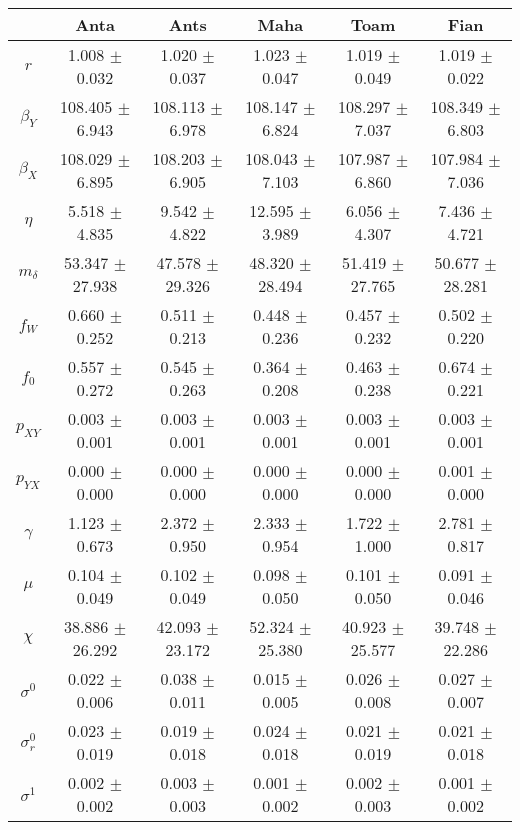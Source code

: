 \begin{sidewaystable}
\centering
\begin{tabular}{cccccc}
 & {\bf Anta} & {\bf Ants} & {\bf Maha} & {\bf Toam} & {\bf Fian} \\
\hline\hline
{\bf $r$} & 1.008 $\pm$ 0.032 & 1.020 $\pm$ 0.037 & 1.023 $\pm$ 0.047 & 1.019 $\pm$ 0.049 & 1.019 $\pm$ 0.022 \\
{\bf $\beta_Y$} & 108.405 $\pm$ 6.943 & 108.113 $\pm$ 6.978 & 108.147 $\pm$ 6.824 & 108.297 $\pm$ 7.037 & 108.349 $\pm$ 6.803 \\
{\bf $\beta_X$} & 108.029 $\pm$ 6.895 & 108.203 $\pm$ 6.905 & 108.043 $\pm$ 7.103 & 107.987 $\pm$ 6.860 & 107.984 $\pm$ 7.036 \\
{\bf $\eta$} & 5.518 $\pm$ 4.835 & 9.542 $\pm$ 4.822 & 12.595 $\pm$ 3.989 & 6.056 $\pm$ 4.307 & 7.436 $\pm$ 4.721 \\
{\bf $m_{\delta}$} & 53.347 $\pm$ 27.938 & 47.578 $\pm$ 29.326 & 48.320 $\pm$ 28.494 & 51.419 $\pm$ 27.765 & 50.677 $\pm$ 28.281 \\
{\bf $f_W$} & 0.660 $\pm$ 0.252 & 0.511 $\pm$ 0.213 & 0.448 $\pm$ 0.236 & 0.457 $\pm$ 0.232 & 0.502 $\pm$ 0.220 \\
{\bf $f_0$} & 0.557 $\pm$ 0.272 & 0.545 $\pm$ 0.263 & 0.364 $\pm$ 0.208 & 0.463 $\pm$ 0.238 & 0.674 $\pm$ 0.221 \\
{\bf $p_{XY}$} & 0.003 $\pm$ 0.001 & 0.003 $\pm$ 0.001 & 0.003 $\pm$ 0.001 & 0.003 $\pm$ 0.001 & 0.003 $\pm$ 0.001 \\
{\bf $p_{YX}$} & 0.000 $\pm$ 0.000 & 0.000 $\pm$ 0.000 & 0.000 $\pm$ 0.000 & 0.000 $\pm$ 0.000 & 0.001 $\pm$ 0.000 \\
{\bf $\gamma$} & 1.123 $\pm$ 0.673 & 2.372 $\pm$ 0.950 & 2.333 $\pm$ 0.954 & 1.722 $\pm$ 1.000 & 2.781 $\pm$ 0.817 \\
{\bf $\mu$} & 0.104 $\pm$ 0.049 & 0.102 $\pm$ 0.049 & 0.098 $\pm$ 0.050 & 0.101 $\pm$ 0.050 & 0.091 $\pm$ 0.046 \\
{\bf $\chi$} & 38.886 $\pm$ 26.292 & 42.093 $\pm$ 23.172 & 52.324 $\pm$ 25.380 & 40.923 $\pm$ 25.577 & 39.748 $\pm$ 22.286 \\
{\bf $\sigma^0$} & 0.022 $\pm$ 0.006 & 0.038 $\pm$ 0.011 & 0.015 $\pm$ 0.005 & 0.026 $\pm$ 0.008 & 0.027 $\pm$ 0.007 \\
{\bf $\sigma^0_r$} & 0.023 $\pm$ 0.019 & 0.019 $\pm$ 0.018 & 0.024 $\pm$ 0.018 & 0.021 $\pm$ 0.019 & 0.021 $\pm$ 0.018 \\
{\bf $\sigma^1$} & 0.002 $\pm$ 0.002 & 0.003 $\pm$ 0.003 & 0.001 $\pm$ 0.002 & 0.002 $\pm$ 0.003 & 0.001 $\pm$ 0.002 \\

\end{tabular}
\end{sidewaystable}
